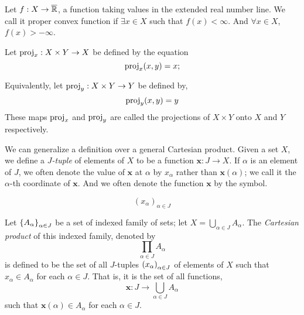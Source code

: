 \begin{definition}
\end{definition}

\begin{definition}
\end{definition}

\begin{definition}
\end{definition}

\begin{definition}
\end{definition}

\begin{definition}
	Let $f: X\rightarrow\overline{\mathbb{R}}$, a function taking values in the extended real number line. We call it proper convex function if $\exists x \in X$ such that $f(x)<\infty$. And $\forall x \in X$, $f(x)>-\infty$.
\end{definition}

\begin{definition}
	Let $\mathrm{proj}_x: X\times Y \rightarrow X$ be defined by the equation
	\begin{equation*}
		\mathrm{proj}_x(x,y)= x;
	\end{equation*}
	
	Equivalently, let $\mathrm{proj}_y: X\times Y \rightarrow Y$ be defined by,
	\begin{equation*}
		\mathrm{proj}_y(x,y)=y
	\end{equation*}
	These maps $\mathrm{proj}_x$ and $\mathrm{proj}_y$ are called the projections of $X\times Y$ onto $X$ and $Y$ respectively.	
\end{definition}

We can generalize a definition over a general Cartesian product. Given a set $X$, we define a \textit{$J$-tuple} of elements of $X$ to be a function $\mathbf{x}:J\rightarrow X$. If $\alpha$ is an element of $J$, we often denote the value of $\mathbf{x}$ at $\alpha$ by $x_\alpha$ rather than $\mathbf{x}(\alpha)$; we call it the $\alpha$-th coordinate of $\mathbf{x}$. And we often denote the function $\mathbf{x}$ by the symbol.

\begin{equation*}
	(x_\alpha)_{\alpha \in J}
\end{equation*} 

Let $\left\lbrace A_\alpha \right\rbrace_{\alpha \in J}$ be a set of indexed family of sets; let $X=\bigcup_{\alpha \in J}A_{\alpha}$. The \textit{Cartesian product} of this indexed family, denoted by
\begin{equation*}
	\prod_{\alpha \in J}A_\alpha
\end{equation*}	
is defined to be the set of all $J$-tuples $\left( x_\alpha \right)_{\alpha \in J}$ of elements of $X$ such that $x_\alpha \in A_\alpha$ for each $\alpha \in J$. That is, it is the set of all functions,
\begin{equation*}
\mathbf{x}: J\rightarrow \bigcup_{\alpha \in J} A_\alpha
\end{equation*}
such that $\mathbf{x}(\alpha)\in A_\alpha$ for each $\alpha \in J$.

